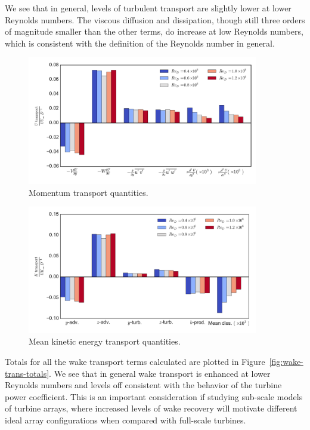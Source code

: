 \documentclass[energies,article,accept,moreauthors,pdftex,12pt,a4paper]{mdpi}
\begin{document}
We see that in general, levels of turbulent transport are slightly lower at
lower Reynolds numbers. The viscous diffusion and dissipation, though still
three orders of magnitude smaller than the other terms, do increase at low
Reynolds numbers, which is consistent with the definition of the Reynolds number
in general.


\begin{figure}[ht!]
\centering
\includegraphics[width=0.9\textwidth]{figures/mom_bar_graph}
\caption{Momentum transport quantities.}
\label{fig:mom-bar-graph}
\end{figure}

\begin{figure}[ht!]
\centering
\includegraphics[width=0.9\textwidth]{figures/K_trans_bar_graph}
\caption{Mean kinetic energy transport quantities.}
\label{fig:K-bar-graph}
\end{figure}


Totals for all the wake transport terms calculated are plotted in
Figure~\ref{fig:wake-trans-totals}. We see that in general wake transport is
enhanced at lower Reynolds numbers and levels off consistent with the behavior
of the  turbine power coefficient. This is an important consideration if
studying sub-scale models of turbine arrays, where increased levels of wake
recovery will motivate different ideal array configurations when compared with
full-scale turbines.
\end{document}
